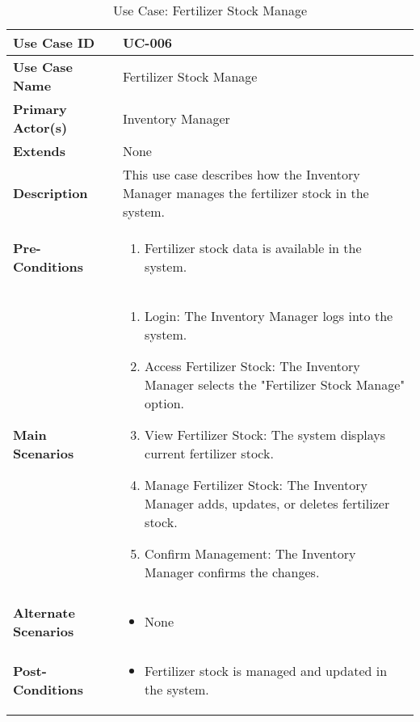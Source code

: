 \documentclass{article}
\begin{document}
\begin{table}[!ht]
    \centering
    \renewcommand{\arraystretch}{1.3} %
    \begin{tabularx}{\textwidth}{|l|X|}
        \hline
        \textbf{Use Case ID} & UC-006 \\
        \hline
        \textbf{Use Case Name} & Fertilizer Stock Manage \\
        \hline
        \textbf{Primary Actor(s)} & Inventory Manager \\
        \hline
        \textbf{Extends} & None \\
        \hline
        \textbf{Description} & This use case describes how the Inventory Manager manages the fertilizer stock in the system. \\
        \hline
        \textbf{Pre-Conditions} & 
        \begin{enumerate}[label=\arabic*.,itemsep=0pt]
            \item Fertilizer stock data is available in the system.
        \end{enumerate} \\
        \hline
        \textbf{Main Scenarios} & 
        \begin{enumerate}[label=\arabic*.,itemsep=0pt]
            \item Login: The Inventory Manager logs into the system.
            \item Access Fertilizer Stock: The Inventory Manager selects the "Fertilizer Stock Manage" option.
            \item View Fertilizer Stock: The system displays current fertilizer stock.
            \item Manage Fertilizer Stock: The Inventory Manager adds, updates, or deletes fertilizer stock.
            \item Confirm Management: The Inventory Manager confirms the changes.
        \end{enumerate} \\
        \hline
        \textbf{Alternate Scenarios} & 
        \begin{itemize}[label=--,itemsep=0pt]
            \item None
        \end{itemize} \\
        \hline
        \textbf{Post-Conditions} & 
        \begin{itemize}[label=--,itemsep=0pt]
            \item Fertilizer stock is managed and updated in the system.
        \end{itemize} \\
        \hline
    \end{tabularx}
    \caption{Use Case: Fertilizer Stock Manage}
    \label{tab:use-case-fertilizer-stock-manage}
\end{table}
\end{document}
